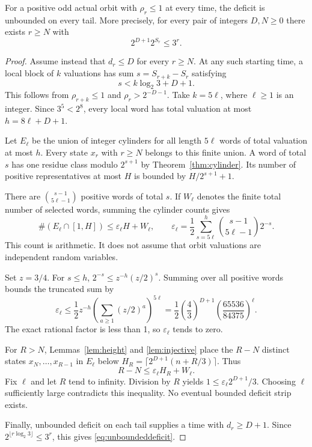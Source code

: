 \begin{theorem}\label{thm:boundeddeficit}
For a positive odd actual orbit with $\rho_r\le1$ at every time, the deficit is unbounded on every tail. More precisely, for every pair of integers $D,N\ge0$ there exists $r\ge N$ with
\begin{equation}\label{eq:unboundeddeficit}
2^{D+1}2^{S_r}\le3^r.
\end{equation}
\end{theorem}
\begin{proof}
Assume instead that $d_r\le D$ for every $r\ge N$. At any such starting time, a local block of $k$ valuations has sum $s=S_{r+k}-S_r$ satisfying
\[
s<k\log_2 3+D+1.
\]
This follows from $\rho_{r+k}\le1$ and $\rho_r>2^{-D-1}$. Take $k=5\ell$, where $\ell\ge1$ is an integer. Since $3^5<2^8$, every local word has total valuation at most $h=8\ell+D+1$.

Let $E_\ell$ be the union of integer cylinders for all length $5\ell$ words of total valuation at most $h$. Every state $x_r$ with $r\ge N$ belongs to this finite union. A word of total $s$ has one residue class modulo $2^{s+1}$ by Theorem~\ref{thm:cylinder}. Its number of positive representatives at most $H$ is bounded by $H/2^{s+1}+1$.

There are $\binom{s-1}{5\ell-1}$ positive words of total $s$. If $W_\ell$ denotes the finite total number of selected words, summing the cylinder counts gives
\[
\#(E_\ell\cap[1,H])\le\varepsilon_\ell H+W_\ell,
\qquad
\varepsilon_\ell=\frac12\sum_{s=5\ell}^{h}
\binom{s-1}{5\ell-1}2^{-s}.
\]
This count is arithmetic. It does not assume that orbit valuations are independent random variables.

Set $z=3/4$. For $s\le h$, $2^{-s}\le z^{-h}(z/2)^s$. Summing over all positive words bounds the truncated sum by
\[
\varepsilon_\ell\le\frac12z^{-h}
\left(\sum_{a\ge1}(z/2)^a\right)^{5\ell}
=\frac12\left(\frac43\right)^{D+1}
\left(\frac{65536}{84375}\right)^\ell.
\]
The exact rational factor is less than 1, so $\varepsilon_\ell$ tends to zero.

For $R>N$, Lemmas~\ref{lem:height} and \ref{lem:injective} place the $R-N$ distinct states $x_N,\ldots,x_{R-1}$ in $E_\ell$ below
$H_R=\lceil2^{D+1}(n+R/3)\rceil$. Thus
\[
R-N\le\varepsilon_\ell H_R+W_\ell.
\]
Fix $\ell$ and let $R$ tend to infinity. Division by $R$ yields
$1\le\varepsilon_\ell2^{D+1}/3$. Choosing $\ell$ sufficiently large contradicts this inequality. No eventual bounded deficit strip exists.

Finally, unbounded deficit on each tail supplies a time with $d_r\ge D+1$. Since $2^{\lfloor r\log_2 3\rfloor}\le3^r$, this gives \eqref{eq:unboundeddeficit}.
\end{proof}

